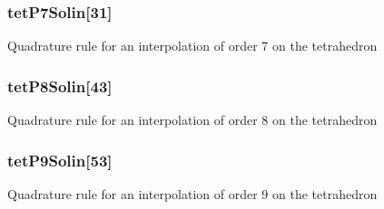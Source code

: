 \subsubsection[{tet\-P7\-Solin}]{ tet\-P7\-Solin[31]}\label{GaussQuadratureTet_8cc_a80e6ef66f8515a9d4f2b235daca30a08}
Quadrature rule for an interpolation of order 7 on the tetrahedron 
\subsubsection[{tet\-P8\-Solin}]{ tet\-P8\-Solin[43]}\label{GaussQuadratureTet_8cc_a04876ca02307cb3e6737f4f7aad6d97c}
Quadrature rule for an interpolation of order 8 on the tetrahedron 
\subsubsection[{tet\-P9\-Solin}]{ tet\-P9\-Solin[53]}\label{GaussQuadratureTet_8cc_ad34eab39ef2edf86f84cab43a31e883c}
Quadrature rule for an interpolation of order 9 on the tetrahedron 